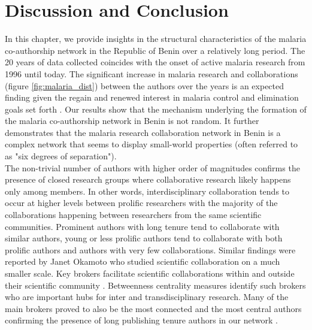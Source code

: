 \section{Discussion and Conclusion}
\label{sec:malaria_discussion}
In this chapter, we provide insights in the structural characteristics of the malaria co-authorship network in the Republic of Benin over a relatively long period. The 20 years of data collected coincides with the onset of active malaria research from 1996 until today. The significant increase in malaria research and collaborations (figure \ref{fig:malaria_dist}) between the authors over the years is an expected finding given the regain and renewed interest in malaria control and elimination goals set forth \cite{alonso_research_2011, breman_eradicating_2009}. Our results show that the mechanism underlying the formation of the malaria co-authorship network in Benin is not random. It further demonstrates that the malaria research collaboration network in Benin is a complex network that seems to display small-world properties (often referred to as "six degrees of separation"). \\%
The non-trivial number of authors with higher order of magnitudes confirms the presence of closed research groups where collaborative research likely happens only among members. In other words, interdisciplinary collaboration tends to occur at higher levels between prolific researchers with the majority of the collaborations happening between researchers from the same scientific communities. Prominent authors with long tenure tend to collaborate with similar authors, young or less prolific authors tend to collaborate with both prolific authors and authors with very few collaborations. Similar findings were reported by Janet Okamoto \cite{the_centers_for_population_health_and_health_disparities_evaluation_working_group_scientific_2015} who studied scientific collaboration on a much smaller scale. %
Key brokers facilitate scientific collaborations within and outside their scientific community \cite{bellanca_measuring_2009}. Betweenness centrality measures identify such brokers who are important hubs for inter and transdisciplinary research. Many of the main brokers proved to also be the most connected and the most central authors confirming the presence of long publishing tenure authors in our network \cite{li_co-authorship_2013}. %
